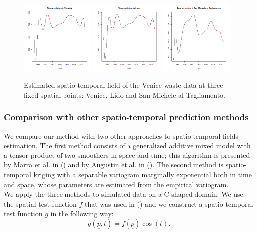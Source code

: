 \documentclass[a4paper,11pt,twoside,openright]{book}							%
\begin{document}
\begin{figure}[H]
\centering
\includegraphics[width=0.32\textwidth]{immagini/Venezia.png}
\includegraphics[width=0.32\textwidth]{immagini/Lido(A).png}
\includegraphics[width=0.32\textwidth]{immagini/SanMicheleTagliamento.png}
\caption{Estimated spatio-temporal field of the Venice waste data at three fixed spatial points: Venice, Lido and San Michele al Tagliamento.}
\label{fig:venezia_tempo}
\end{figure}


\subsubsection*{Comparison with other spatio-temporal prediction methods}

We compare our method with two other approaches to spatio-temporal fields estimation. The first method consists of a generalized additive mixed model with a tensor product of two smoothers in space and time; this algorithm is presented by Marra et al. in (\cite{art:marra}) and by Augustin et al. in (\cite{art:augustin}). The second method is spatio-temporal kriging with a separable variogram marginally exponential both in time and space, whose parameters are estimated from the empirical variogram.\\
We apply the three methods to simulated data on a C-shaped domain. We use the spatial test function $f$ that was used in (\cite{art:wood}) and we construct a spatio-temporal test function $g$ in the following way:
$$ g(\underline p,t)= f(\underline p) \cos(t) .$$
\end{document}
